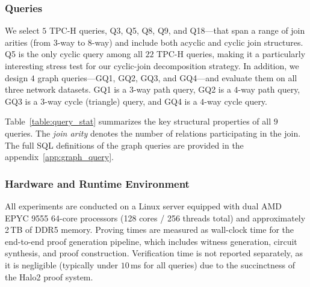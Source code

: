 \documentclass[sigconf]{acmart}
\renewcommand{\emph}[1]{\textit{#1}}
\begin{document}
\subsubsection{Queries}
We select $5$ TPC-H queries, Q3, Q5, Q8, Q9, and Q18---that span a range of join arities (from $3$-way to $8$-way) and include both acyclic and cyclic join structures. Q5 is the only cyclic query among all $22$ TPC-H queries, making it a particularly interesting stress test for our cyclic-join decomposition strategy. In addition, we design $4$ graph queries---GQ1, GQ2, GQ3, and GQ4---and evaluate them on all three network datasets. GQ1 is a $3$-way path query, GQ2 is a $4$-way path query, GQ3 is a $3$-way cycle (triangle) query, and GQ4 is a $4$-way cycle query. 

Table~\ref{table:query_stat} summarizes the key structural properties of all $9$ queries. The \emph{join arity} denotes the number of relations participating in the join. The full SQL definitions of the graph queries are provided in the appendix~\ref{app:graph_query}.












\subsubsection{Hardware and Runtime Environment}
All experiments are conducted on a Linux server equipped with dual AMD EPYC 9555 64-core processors (128 cores / 256 threads total) and approximately 2\,TB of DDR5 memory. Proving times are measured as wall-clock time for the end-to-end proof generation pipeline, which includes witness generation, circuit synthesis, and proof construction. Verification time is not reported separately, as it is negligible (typically under $10$\,ms for all queries) due to the succinctness of the Halo2 proof system.
\end{document}
